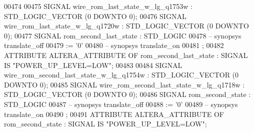 \begin{DoxyCode}
{00474 
00475      \textcolor{keywordflow}{SIGNAL}  \textcolor{vhdlchar}{wire_rom_last_state_w_lg_q1753w}    \textcolor{vhdlchar}{:}   \textcolor{comment}{STD\_LOGIC\_VECTOR} \textcolor{vhdlchar}{(}\textcolor{vhdllogic}{}\textcolor{vhdllogic}{0} \textcolor{keywordflow}{DOWNTO} \textcolor{vhdllogic}{}\textcolor{vhdllogic}{0}\textcolor{vhdlchar}{)};
00476      \textcolor{keywordflow}{SIGNAL}  \textcolor{vhdlchar}{wire_rom_last_state_w_lg_q1720w}    \textcolor{vhdlchar}{:}   \textcolor{comment}{STD\_LOGIC\_VECTOR} \textcolor{vhdlchar}{(}\textcolor{vhdllogic}{}\textcolor{vhdllogic}{0} \textcolor{keywordflow}{DOWNTO} \textcolor{vhdllogic}{}\textcolor{vhdllogic}{0}\textcolor{vhdlchar}{)};
00477      \textcolor{keywordflow}{SIGNAL}  \textcolor{vhdlchar}{rom_second_last_state}  \textcolor{vhdlchar}{:}   \textcolor{comment}{STD\_LOGIC}
00478 \textcolor{keyword}{     -- synopsys translate\_off}
00479       \textcolor{vhdlchar}{:=} \textcolor{vhdlchar}{'}\textcolor{vhdllogic}{}\textcolor{vhdllogic}{0}\textcolor{vhdlchar}{'}
00480 \textcolor{keyword}{     -- synopsys translate\_on}
00481      ;
00482      \textcolor{keywordflow}{ATTRIBUTE} \textcolor{vhdlchar}{ALTERA_ATTRIBUTE} \textcolor{keywordflow}{OF} \textcolor{vhdlchar}{rom_second_last_state} \textcolor{vhdlchar}{:} \textcolor{keywordflow}{SIGNAL} \textcolor{keywordflow}{IS} \textcolor{keyword}{"POWER\_UP\_LEVEL=LOW"};
00483 
00484      \textcolor{keywordflow}{SIGNAL}  \textcolor{vhdlchar}{wire_rom_second_last_state_w_lg_q1754w} \textcolor{vhdlchar}{:}   \textcolor{comment}{STD\_LOGIC\_VECTOR} \textcolor{vhdlchar}{(}\textcolor{vhdllogic}{}\textcolor{vhdllogic}{0} \textcolor{keywordflow}{DOWNTO} \textcolor{vhdllogic}{}\textcolor{vhdllogic}{0}\textcolor{vhdlchar}{)};
00485      \textcolor{keywordflow}{SIGNAL}  \textcolor{vhdlchar}{wire_rom_second_last_state_w_lg_q1718w} \textcolor{vhdlchar}{:}   \textcolor{comment}{STD\_LOGIC\_VECTOR} \textcolor{vhdlchar}{(}\textcolor{vhdllogic}{}\textcolor{vhdllogic}{0} \textcolor{keywordflow}{DOWNTO} \textcolor{vhdllogic}{}\textcolor{vhdllogic}{0}\textcolor{vhdlchar}{)};
00486      \textcolor{keywordflow}{SIGNAL}  \textcolor{vhdlchar}{rom_second_state}   \textcolor{vhdlchar}{:}   \textcolor{comment}{STD\_LOGIC}
00487 \textcolor{keyword}{     -- synopsys translate\_off}
00488       \textcolor{vhdlchar}{:=} \textcolor{vhdlchar}{'}\textcolor{vhdllogic}{}\textcolor{vhdllogic}{0}\textcolor{vhdlchar}{'}
00489 \textcolor{keyword}{     -- synopsys translate\_on}
00490      ;
00491      \textcolor{keywordflow}{ATTRIBUTE} \textcolor{vhdlchar}{ALTERA_ATTRIBUTE} \textcolor{keywordflow}{OF} \textcolor{vhdlchar}{rom_second_state} \textcolor{vhdlchar}{:} \textcolor{keywordflow}{SIGNAL} \textcolor{keywordflow}{IS} \textcolor{keyword}{"POWER\_UP\_LEVEL=LOW"};
}
\end{DoxyCode}

